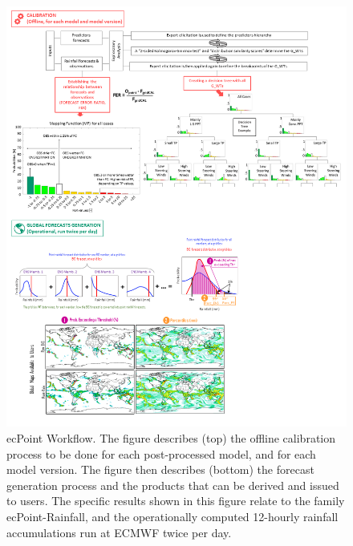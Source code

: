 \documentclass[twocol]{ametsocV5} %
\begin{document}
\begin{figure}
\centerline{\includegraphics[width=39pc]{manuscript/Figures/Fig1.png}}
\caption{ecPoint Workflow. The figure describes (top) the offline calibration process to be done for each post-processed model, and for each model version. The figure then describes (bottom) the forecast generation process and the products that can be derived and issued to users. The specific results shown in this figure relate to the family ecPoint-Rainfall, and the operationally computed 12-hourly rainfall accumulations run at ECMWF twice per day.}
\label{Fig.1}
\end{figure}
\end{document}
